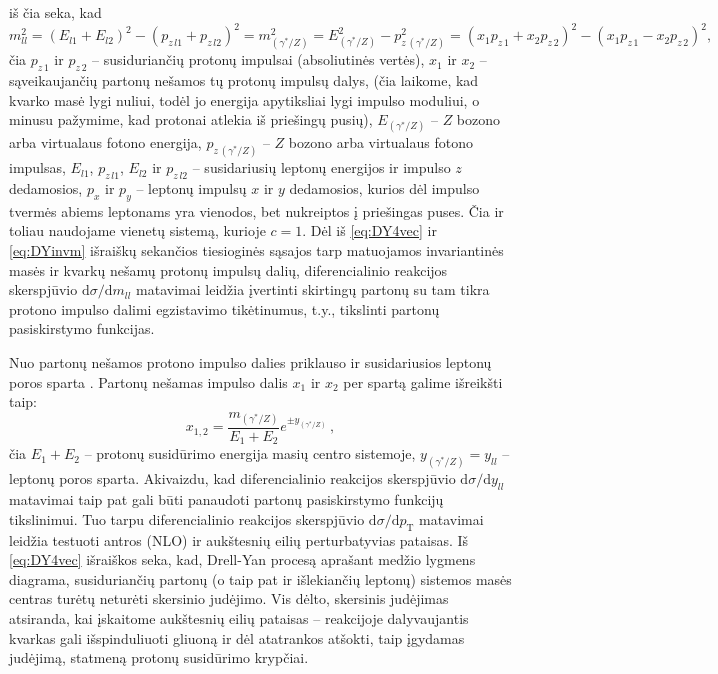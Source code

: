 \documentclass[a4paper, 12pt, oneside]{article}
\newcommand{\pT}{p_{\mathrm{T}}}
\newlength\q
\begin{document}
iš čia seka, kad
\begin{equation}
\label{eq:DYinvm}
	m^2_{ll} = (E_{l1}+E_{l2})^2-(p_{z\,l1}+p_{z\,l2})^2 = m^2_{(\gamma^*\!/\!Z)} = E^2_{(\gamma^*\!/\!Z)}-p^2_{z\,(\gamma^*\!/\!Z)} =
	(x_1p_{z\,1}+x_2p_{z\,2})^2-(x_1p_{z\,1}-x_2p_{z\,2})^2 \!,
\end{equation}
čia $p_{z\,1}$ ir $p_{z\,2}$ -- susiduriančių protonų impulsai (absoliutinės vertės), $x_1$ ir $x_2$ -- sąveikaujančių partonų nešamos
tų protonų impulsų dalys, (čia laikome, kad kvarko masė lygi nuliui, todėl jo energija apytiksliai lygi impulso moduliui, o minusu
pažymime, kad protonai atlekia iš priešingų pusių), $E_{(\gamma^*\!/\!Z)}$ -- $Z$ bozono arba virtualaus fotono energija,
$p_{z\,(\gamma^*\!/\!Z)}$ -- $Z$ bozono arba virtualaus fotono impulsas, $E_{l1}$, $p_{z\,l1}$, $E_{l2}$ ir $p_{z\,l2}$ -- susidariusių
leptonų energijos ir impulso $z$ dedamosios, $p_{x}$ ir $p_{y}$ -- leptonų impulsų $x$ ir $y$ dedamosios, kurios dėl impulso tvermės
abiems leptonams yra vienodos, bet nukreiptos į priešingas puses.
Čia ir toliau naudojame vienetų sistemą, kurioje $c\!=\!1$.
Dėl iš \eqref{eq:DY4vec} ir \eqref{eq:DYinvm} išraiškų sekančios tiesioginės sąsajos tarp matuojamos invariantinės masės ir kvarkų
nešamų protonų impulsų dalių, diferencialinio reakcijos skerspjūvio $\mathrm{d}\sigma/\mathrm{d}m_{ll}$
matavimai leidžia įvertinti skirtingų partonų su tam tikra protono impulso dalimi egzistavimo tikėtinumus,
t.y., tikslinti partonų pasiskirstymo funkcijas.

Nuo partonų nešamos protono impulso dalies priklauso ir susidariusios leptonų poros sparta \cite{DYrapi}.
Partonų nešamas impulso dalis $x_1$ ir $x_2$ per spartą galime išreikšti taip:
\begin{equation}
	x_{1,2} = \frac{m_{(\gamma^*\!/\!Z)}}{E_1+E_2}e^{\pm y_{(\gamma^*\!/\!Z)}} \, ,
\end{equation}
čia $E_1\!+\!E_2$ -- protonų susidūrimo energija masių centro sistemoje, $y_{(\gamma^*\!/\!Z)}\!=\!y_{ll}$ -- leptonų poros sparta.
Akivaizdu, kad diferencialinio reakcijos skerspjūvio $\mathrm{d}\sigma/\mathrm{d}y_{ll}$ matavimai taip pat gali būti
panaudoti partonų pasiskirstymo funkcijų tikslinimui.
Tuo tarpu diferencialinio reakcijos skerspjūvio $\mathrm{d}\sigma/\mathrm{d}\pT$ matavimai leidžia testuoti antros (NLO) ir
aukštesnių eilių perturbatyvias pataisas.
Iš \eqref{eq:DY4vec} išraiškos seka, kad, Drell-Yan procesą aprašant medžio lygmens diagrama, susiduriančių partonų
(o taip pat ir išlekiančių leptonų) sistemos masės centras turėtų neturėti skersinio judėjimo.
Vis dėlto, skersinis judėjimas atsiranda, kai įskaitome aukštesnių eilių pataisas -- reakcijoje dalyvaujantis kvarkas gali išspinduliuoti
gliuoną ir dėl atatrankos atšokti, taip įgydamas judėjimą, statmeną protonų susidūrimo krypčiai.
\end{document}
